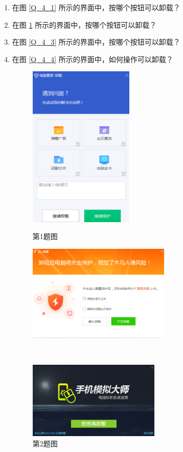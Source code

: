 \begin{enumerate}
  \item 在图 \ref{Q_4_1} 所示的界面中，按哪个按钮可以卸载？
  \item 在图 \ref{Q_4_2} 所示的界面中，按哪个按钮可以卸载？
  \item 在图 \ref{Q_4_3} 所示的界面中，按哪个按钮可以卸载？
  \item 在图 \ref{Q_4_4} 所示的界面中，如何操作可以卸载？
    \begin{figure}[htb!]
      \centering
      \begin{minipage}{5.5cm}
        \centering
        \includegraphics[width=5cm]{assets/Q_4_1.png}
        \caption{第1题图}
        \label{Q_4_1}
      \end{minipage}
      \qquad
      \begin{minipage}{7.5cm}
        \centering
        \includegraphics[width=6.8cm]{assets/Q_4_2.png}
        \caption{第2题图}
        \label{Q_4_2}
      \end{minipage}
      \\\vspace*{2ex}
      \begin{minipage}{6.7cm}
        \centering
        \includegraphics[width=6.3cm]{assets/Q_4_3.png}

\end{minipage}
\end{figure}
\end{enumerate}

